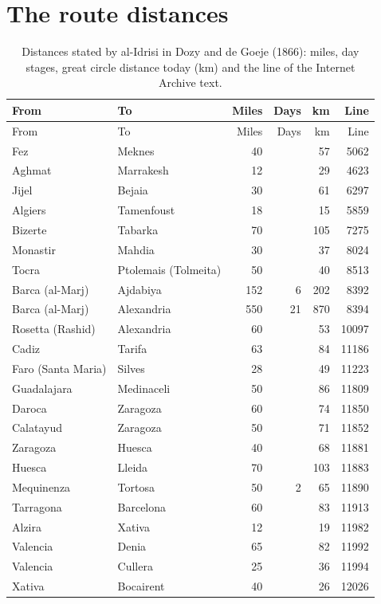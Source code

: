 \documentclass[11pt,a4paper]{article}
\begin{document}
\section{The route distances}
{\footnotesize\begin{longtable}{p{4.2cm}p{4.2cm}rrrr}\caption{Distances stated by al-Idrisi in Dozy and de Goeje (1866): miles, day stages, great circle distance today (km) and the line of the Internet Archive text.}\label{tab:routes}\\\toprule From & To & Miles & Days & km & Line\\\midrule\endfirsthead\toprule From & To & Miles & Days & km & Line\\\midrule\endhead
Fez & Meknes & 40 &  & 57 & 5062\\
Aghmat & Marrakesh & 12 &  & 29 & 4623\\
Jijel & Bejaia & 30 &  & 61 & 6297\\
Algiers & Tamenfoust & 18 &  & 15 & 5859\\
Bizerte & Tabarka & 70 &  & 105 & 7275\\
Monastir & Mahdia & 30 &  & 37 & 8024\\
Tocra & Ptolemais (Tolmeita) & 50 &  & 40 & 8513\\
Barca (al-Marj) & Ajdabiya & 152 & 6 & 202 & 8392\\
Barca (al-Marj) & Alexandria & 550 & 21 & 870 & 8394\\
Rosetta (Rashid) & Alexandria & 60 &  & 53 & 10097\\
Cadiz & Tarifa & 63 &  & 84 & 11186\\
Faro (Santa Maria) & Silves & 28 &  & 49 & 11223\\
Guadalajara & Medinaceli & 50 &  & 86 & 11809\\
Daroca & Zaragoza & 60 &  & 74 & 11850\\
Calatayud & Zaragoza & 50 &  & 71 & 11852\\
Zaragoza & Huesca & 40 &  & 68 & 11881\\
Huesca & Lleida & 70 &  & 103 & 11883\\
Mequinenza & Tortosa & 50 & 2 & 65 & 11890\\
Tarragona & Barcelona & 60 &  & 83 & 11913\\
Alzira & Xativa & 12 &  & 19 & 11982\\
Valencia & Denia & 65 &  & 82 & 11992\\
Valencia & Cullera & 25 &  & 36 & 11994\\
Xativa & Bocairent & 40 &  & 26 & 12026\\

\end{longtable}}
\end{document}
